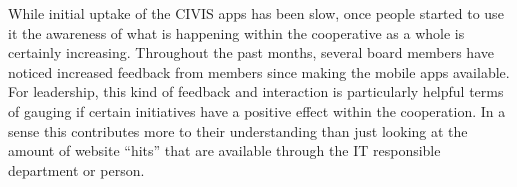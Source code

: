 While initial uptake of the CIVIS apps has been slow, once people started to use it the
awareness of what is happening within the cooperative as a whole is certainly increasing.
Throughout the past months, several board members have noticed increased feedback from members since making the mobile apps available. For leadership, this kind of feedback
and interaction is particularly helpful terms of gauging if certain initiatives have a positive
effect within the cooperation. In a sense this contributes more to their understanding than
just looking at the amount of website ``hits'' that are available through the IT responsible
department or person. 


